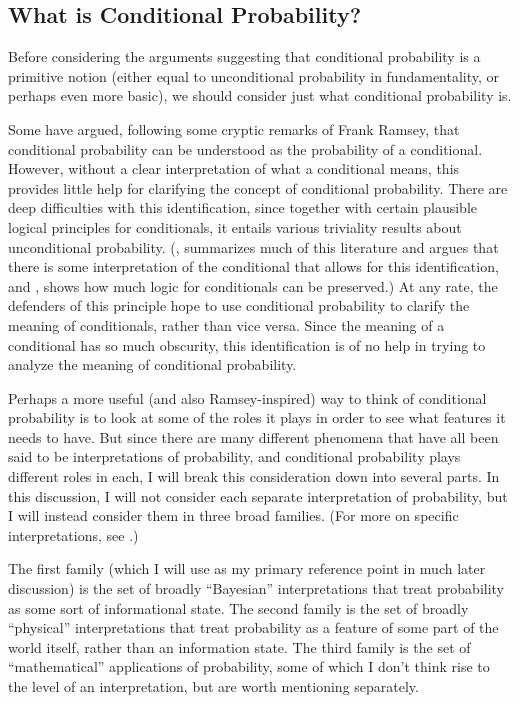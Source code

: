 \subsection{What is Conditional Probability?}\label{whatis}

Before considering the arguments suggesting that conditional probability is a primitive notion (either equal to unconditional probability in fundamentality, or perhaps even more basic), we should consider just what conditional probability is.

Some have argued, following some cryptic remarks of Frank Ramsey, that conditional probability can be understood as the probability of a conditional. However, without a clear interpretation of what a conditional means, this provides little help for clarifying the concept of conditional probability. There are deep difficulties with this identification, since together with certain plausible logical principles for conditionals, it entails various triviality results about unconditional probability. (\citealp{edgington}, summarizes much of this literature and argues that there is some interpretation of the conditional that allows for this identification, and \citealp{baconstalnaker}, shows how much logic for conditionals can be preserved.) At any rate, the defenders of this principle hope to use conditional probability to clarify the meaning of conditionals, rather than vice versa. Since the meaning of a conditional has so much obscurity, this identification is of no help in trying to analyze the meaning of conditional probability.

Perhaps a more useful (and also Ramsey-inspired) way to think of conditional probability is to look at some of the roles it plays in order to see what features it needs to have. But since there are many different phenomena that have all been said to be interpretations of probability, and conditional probability plays different roles in each, I will break this consideration down into several parts. In this discussion, I will not consider each separate interpretation of probability, but I will instead consider them in three broad families. (For more on specific interpretations, see \citet{interp}.)

The first family (which I will use as my primary reference point in much later discussion) is the set of broadly ``Bayesian'' interpretations that treat probability as some sort of informational state. The second family is the set of broadly ``physical'' interpretations that treat probability as a feature of some part of the world itself, rather than an information state. The third family is the set of ``mathematical'' applications of probability, some of which I don't think rise to the level of an interpretation, but are worth mentioning separately.

